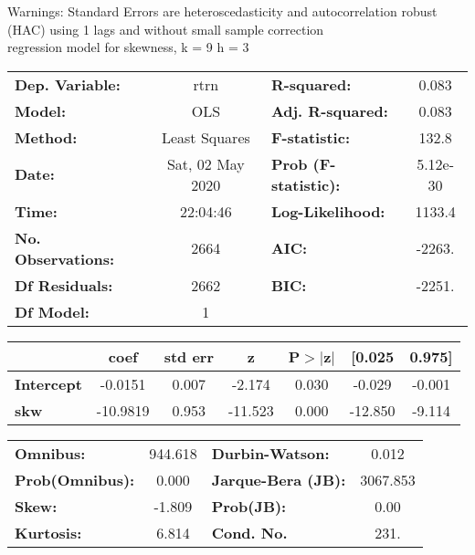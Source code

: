 Warnings: \newline
 [1] Standard Errors are heteroscedasticity and autocorrelation robust (HAC) using 1 lags and without small sample correction\\ 

regression model for skewness, k = 9 h = 3\begin{center}
\begin{tabular}{lclc}
\toprule
\textbf{Dep. Variable:}    &       rtrn       & \textbf{  R-squared:         } &     0.083   \\
\textbf{Model:}            &       OLS        & \textbf{  Adj. R-squared:    } &     0.083   \\
\textbf{Method:}           &  Least Squares   & \textbf{  F-statistic:       } &     132.8   \\
\textbf{Date:}             & Sat, 02 May 2020 & \textbf{  Prob (F-statistic):} &  5.12e-30   \\
\textbf{Time:}             &     22:04:46     & \textbf{  Log-Likelihood:    } &    1133.4   \\
\textbf{No. Observations:} &        2664      & \textbf{  AIC:               } &    -2263.   \\
\textbf{Df Residuals:}     &        2662      & \textbf{  BIC:               } &    -2251.   \\
\textbf{Df Model:}         &           1      & \textbf{                     } &             \\
\bottomrule
\end{tabular}
\begin{tabular}{lcccccc}
                   & \textbf{coef} & \textbf{std err} & \textbf{z} & \textbf{P$> |$z$|$} & \textbf{[0.025} & \textbf{0.975]}  \\
\midrule
\textbf{Intercept} &      -0.0151  &        0.007     &    -2.174  &         0.030        &       -0.029    &       -0.001     \\
\textbf{skw}       &     -10.9819  &        0.953     &   -11.523  &         0.000        &      -12.850    &       -9.114     \\
\bottomrule
\end{tabular}
\begin{tabular}{lclc}
\textbf{Omnibus:}       & 944.618 & \textbf{  Durbin-Watson:     } &    0.012  \\
\textbf{Prob(Omnibus):} &   0.000 & \textbf{  Jarque-Bera (JB):  } & 3067.853  \\
\textbf{Skew:}          &  -1.809 & \textbf{  Prob(JB):          } &     0.00  \\
\textbf{Kurtosis:}      &   6.814 & \textbf{  Cond. No.          } &     231.  \\
\bottomrule
\end{tabular}
\end{center}

